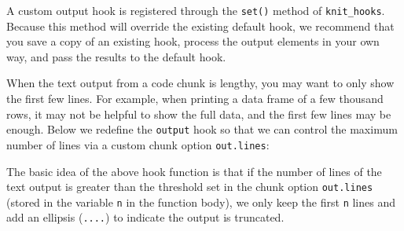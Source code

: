 \documentclass[
  a4paper,
  twoside,
  openright]{book}
\newenvironment{Shaded}{\begin{snugshade}}{\end{snugshade}}
\newcommand{\AttributeTok}[1]{\textcolor[rgb]{0.13,0.29,0.53}{#1}}
\newcommand{\CommentTok}[1]{\textcolor[rgb]{0.56,0.35,0.01}{\textit{#1}}}
\newcommand{\ControlFlowTok}[1]{\textcolor[rgb]{0.13,0.29,0.53}{\textbf{#1}}}
\newcommand{\FunctionTok}[1]{\textcolor[rgb]{0.13,0.29,0.53}{\textbf{#1}}}
\newcommand{\NormalTok}[1]{#1}
\newcommand{\OtherTok}[1]{\textcolor[rgb]{0.56,0.35,0.01}{#1}}
\newcommand{\SpecialCharTok}[1]{\textcolor[rgb]{0.81,0.36,0.00}{\textbf{#1}}}
\newcommand{\StringTok}[1]{\textcolor[rgb]{0.31,0.60,0.02}{#1}}
\theoremstyle{definition}
\theoremstyle{definition}
\theoremstyle{definition}
\theoremstyle{definition}
\theoremstyle{remark}
\begin{document}
A custom output hook is registered through the \texttt{set()} method of \texttt{knit\_hooks}. Because this method will override the existing default hook, we recommend that you save a copy of an existing hook, process the output elements in your own way, and pass the results to the default hook.

When the text output from a code chunk is lengthy, you may want to only show the first few lines. For example, when printing a data frame of a few thousand rows, it may not be helpful to show the full data, and the first few lines may be enough. Below we redefine the \texttt{output} hook so that we can control the maximum number of lines via a custom chunk option \texttt{out.lines}:

\begin{Shaded}
\end{Shaded}

The basic idea of the above hook function is that if the number of lines of the text output is greater than the threshold set in the chunk option \texttt{out.lines} (stored in the variable \texttt{n} in the function body), we only keep the first \texttt{n} lines and add an ellipsis (\texttt{....}) to indicate the output is truncated.
\end{document}
